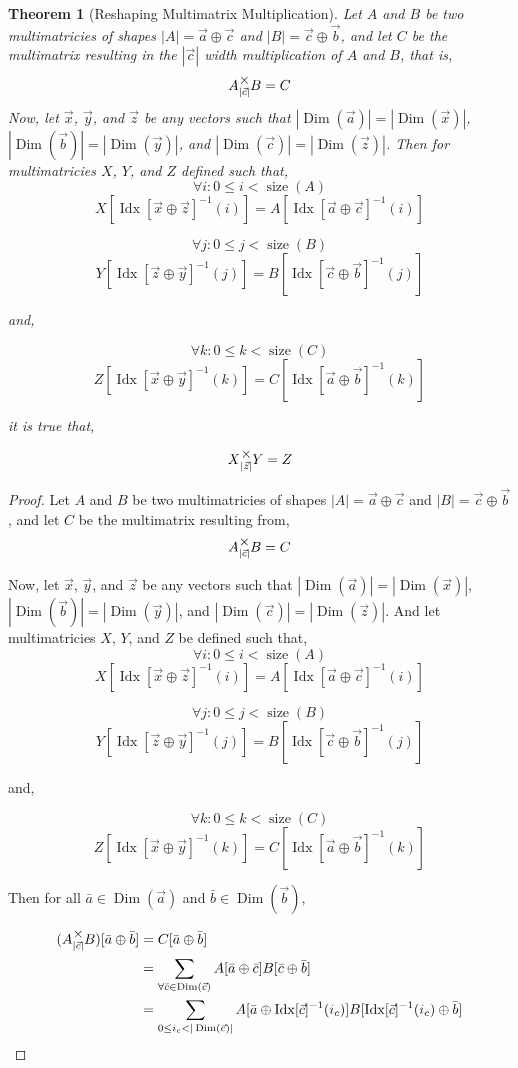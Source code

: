 \documentclass[12pt]{book}
\theoremstyle{plain}
\newtheorem{theorem}{Theorem}[chapter]
\theoremstyle{definition}
\theoremstyle{ppart}
\theoremstyle{case}
\theoremstyle{solution}
\DeclareMathOperator{\Dim}{Dim}
\DeclareMathOperator{\Idx}{Idx}
\DeclareMathOperator{\size}{size}
\newcommand{\mmult}[1]{\text{\raisebox{1ex}{$\underset{#1}{\times}$}}}
\begin{document}
\begin{landscape}
\begin{theorem}[Reshaping Multimatrix Multiplication]
Let $A$ and $B$ be two multimatricies of shapes $|A| = \vec{a} \oplus \vec{c}$ and
$|B| = \vec{c} \oplus \vec{b}$, and let $C$ be the multimatrix resulting in the $|\vec{c}|$
width multiplication of $A$ and $B$, that is,
\[ A \mmult{|\vec{c}|} B = C \]
Now, let $\vec{x}$, $\vec{y}$, and $\vec{z}$ be any vectors such that
$|\Dim(\vec{a})| = |\Dim(\vec{x})|$,
$|\Dim(\vec{b})| = |\Dim(\vec{y})|$,
and 
$|\Dim(\vec{c})| = |\Dim(\vec{z})|$.
Then for multimatricies $X$, $Y$, and $Z$ defined such that,
\[\forall i : 0 \le i < \size(A) \]
\[ X[\Idx[\vec{x} \oplus \vec{z}]^{-1}(i)] = A[\Idx[\vec{a} \oplus \vec{c}]^{-1}(i)] \]

\[\forall j : 0 \le j < \size(B)\]
\[ Y[\Idx[\vec{z} \oplus \vec{y}]^{-1}(j)] = B[\Idx[\vec{c} \oplus \vec{b}]^{-1}(j)] \]

and,

\[\forall k : 0 \le k < \size(C)\]
\[ Z[\Idx[\vec{x} \oplus \vec{y}]^{-1}(k)] = C[\Idx[\vec{a} \oplus \vec{b}]^{-1}(k)] \]

it is true that,

\[ X \mmult{|\vec{z}|} Y = Z \]
\end{theorem}
\begin{proof}
Let $A$ and $B$ be two multimatricies of shapes $|A| = \vec{a} \oplus \vec{c}$ and
$|B| = \vec{c} \oplus \vec{b}$, and let $C$ be the multimatrix resulting from,
\[ A \mmult{|\vec{c}|} B = C \]

Now, let $\vec{x}$, $\vec{y}$, and $\vec{z}$ be any vectors such that
$|\Dim(\vec{a})| = |\Dim(\vec{x})|$,
$|\Dim(\vec{b})| = |\Dim(\vec{y})|$,
and 
$|\Dim(\vec{c})| = |\Dim(\vec{z})|$.
And let multimatricies $X$, $Y$, and $Z$ be defined such that,
\[\forall i : 0 \le i < \size(A) \]
\[ X[\Idx[\vec{x} \oplus \vec{z}]^{-1}(i)] = A[\Idx[\vec{a} \oplus \vec{c}]^{-1}(i)] \]

\[\forall j : 0 \le j < \size(B)\]
\[ Y[\Idx[\vec{z} \oplus \vec{y}]^{-1}(j)] = B[\Idx[\vec{c} \oplus \vec{b}]^{-1}(j)] \]

and,

\[\forall k : 0 \le k < \size(C)\]
\[ Z[\Idx[\vec{x} \oplus \vec{y}]^{-1}(k)] = C[\Idx[\vec{a} \oplus \vec{b}]^{-1}(k)] \]

Then for all $\bar{a} \in \Dim(\vec{a})$ and $\bar{b} \in \Dim(\vec{b})$,

\begin{align*}
  (A \mmult{|\vec{c}|} B)[\bar{a} \oplus \bar{b}]
  &= C[\bar{a} \oplus \bar{b}] \\
  &=
  \sum_{\forall \bar{c} \in \Dim(\vec{c})} A[\bar{a} \oplus \bar{c}] B[\bar{c} \oplus \bar{b}] \\
  &=
  \sum_{0 \le i_c < |\Dim(\vec{c})|} A[\bar{a} \oplus \Idx[\vec{c}]^{-1}(i_c)] B[\Idx[\vec{c}]^{-1}(i_c) \oplus \bar{b}]
\end{align*}


\end{proof}
\end{landscape}
\end{document}
